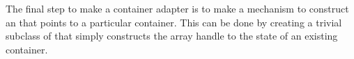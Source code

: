 
The final step to make a container adapter is to make a mechanism to
construct an  that points to a particular
container. This can be done by creating a trivial subclass of
 that simply constructs the array handle to the state
of an existing container.










